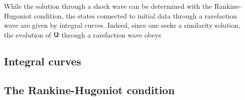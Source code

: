 

While the solution through a shock wave can be determined with the Rankine-Hugoniot condition, the states connected to initial data through a rarefaction wave are given by integral curves. Indeed, since one seeks a similarity solution, the evolution of ${\boldsymbol{\mathcal{Q}}}$ through a rarefaction wave obeys

\subsection{Integral curves}
\subsection{The Rankine-Hugoniot condition}


